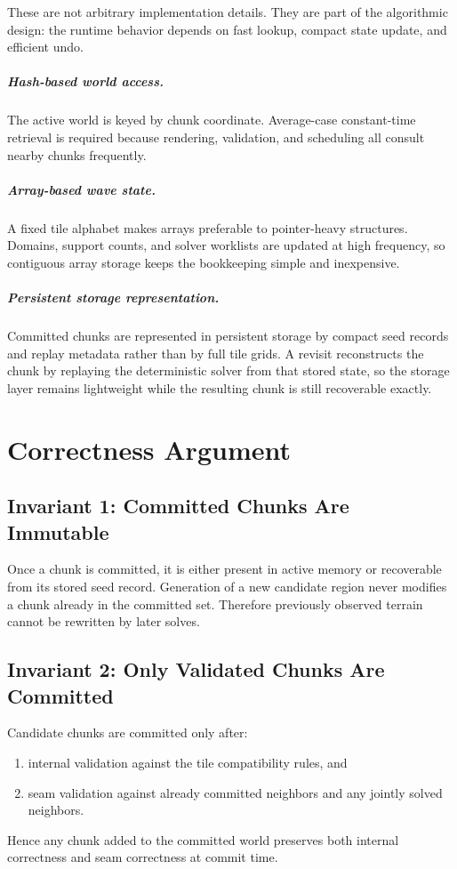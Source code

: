 \documentclass[12pt,a4paper]{report}
\begin{document}
These are not arbitrary implementation details. They are part of the algorithmic design: the runtime behavior depends on fast lookup, compact state update, and efficient undo.

\paragraph{Hash-based world access.} The active world is keyed by chunk coordinate. Average-case constant-time retrieval is required because rendering, validation, and scheduling all consult nearby chunks frequently.

\paragraph{Array-based wave state.} A fixed tile alphabet makes arrays preferable to pointer-heavy structures. Domains, support counts, and solver worklists are updated at high frequency, so contiguous array storage keeps the bookkeeping simple and inexpensive.

\paragraph{Persistent storage representation.} Committed chunks are represented in persistent storage by compact seed records and replay metadata rather than by full tile grids. A revisit reconstructs the chunk by replaying the deterministic solver from that stored state, so the storage layer remains lightweight while the resulting chunk is still recoverable exactly.

\chapter{Correctness Argument}
\section{Invariant 1: Committed Chunks Are Immutable}
Once a chunk is committed, it is either present in active memory or recoverable from its stored seed record. Generation of a new candidate region never modifies a chunk already in the committed set. Therefore previously observed terrain cannot be rewritten by later solves.

\section{Invariant 2: Only Validated Chunks Are Committed}
Candidate chunks are committed only after:
\begin{enumerate}
\item internal validation against the tile compatibility rules, and
\item seam validation against already committed neighbors and any jointly solved neighbors.
\end{enumerate}
Hence any chunk added to the committed world preserves both internal correctness and seam correctness at commit time.
\end{document}
